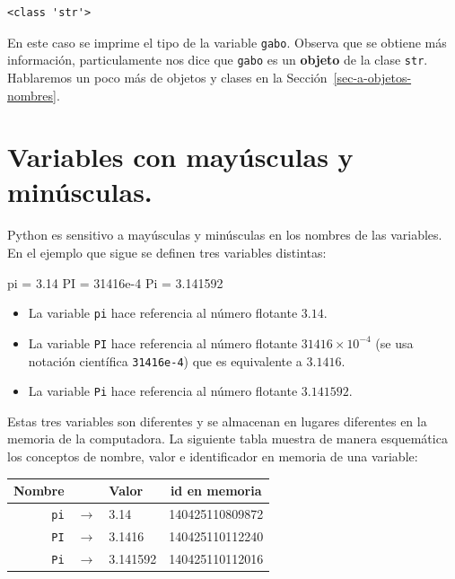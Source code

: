 \documentclass[
  spanish,
  letterpaper,
]{scrbook}
\newenvironment{Shaded}{\begin{snugshade}}{\end{snugshade}}
\newcommand{\FloatTok}[1]{\textcolor[rgb]{0.68,0.00,0.00}{#1}}
\newcommand{\NormalTok}[1]{\textcolor[rgb]{0.00,0.23,0.31}{#1}}
\newcommand{\OperatorTok}[1]{\textcolor[rgb]{0.37,0.37,0.37}{#1}}
\providecommand{\tightlist}{%
  \setlength{\itemsep}{0pt}\setlength{\parskip}{0pt}}
\theoremstyle{definition}
\theoremstyle{remark}
\begin{document}
\begin{verbatim}
<class 'str'>
\end{verbatim}

En este caso se imprime el tipo de la variable \texttt{gabo}. Observa
que se obtiene más información, particulamente nos dice que
\texttt{gabo} es un \textbf{objeto} de la clase
\texttt{\textquotesingle{}str\textquotesingle{}}. Hablaremos un poco más
de objetos y clases en la Sección~\ref{sec-a-objetos-nombres}.

\section{Variables con mayúsculas y
minúsculas.}\label{sec-a-var-mayusculas-minusculas}

Python es sensitivo a mayúsculas y minúsculas en los nombres de las
variables. En el ejemplo que sigue se definen tres variables distintas:

\begin{Shaded}
\begin{Highlighting}[]
\NormalTok{pi }\OperatorTok{=} \FloatTok{3.14}     
\NormalTok{PI }\OperatorTok{=} \FloatTok{31416e{-}4} 
\NormalTok{Pi }\OperatorTok{=} \FloatTok{3.141592}
\end{Highlighting}
\end{Shaded}

\begin{itemize}
\tightlist
\item
  La variable \texttt{pi} hace referencia al número flotante \(3.14\).
\item
  La variable \texttt{PI} hace referencia al número flotante
  \(31416 \times 10^{-4}\) (se usa notación científica
  \texttt{31416e-4}) que es equivalente a \(3.1416\).
\item
  La variable \texttt{Pi} hace referencia al número flotante
  \(3.141592\).
\end{itemize}

Estas tres variables son diferentes y se almacenan en lugares diferentes
en la memoria de la computadora. La siguiente tabla muestra de manera
esquemática los conceptos de nombre, valor e identificador en memoria de
una variable:

\begin{longtable}[]{@{}rllc@{}}
\toprule\noalign{}
Nombre & & Valor & id en memoria \\
\midrule\noalign{}
\endhead
\bottomrule\noalign{}
\endlastfoot
\texttt{pi} & \(\rightarrow\) & 3.14 & 140425110809872 \\
\texttt{PI} & \(\rightarrow\) & 3.1416 & 140425110112240 \\
\texttt{Pi} & \(\rightarrow\) & 3.141592 & 140425110112016 \\
\end{longtable}
\end{document}
